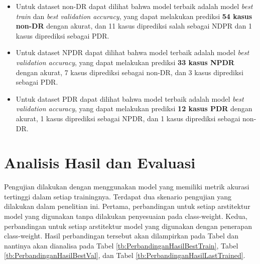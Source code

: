 \begin{itemize}
	\item Untuk dataset non-DR dapat dilihat bahwa model terbaik adalah model \emph{best train} dan \emph{best validation accuracy}, yang dapat melakukan prediksi \textbf{54 kasus non-DR} dengan akurat, dan 11 kasus diprediksi salah sebagai NDPR dan 1 kasus diprediksi sebagai PDR.
	
	\item Untuk dataset NPDR dapat dilihat bahwa model terbaik adalah model \emph{best validation accuracy}, yang dapat melakukan prediksi \textbf{33 kasus NPDR} dengan akurat, 7 kasus diprediksi sebagai non-DR, dan 3 kasus diprediksi sebagai PDR.
	
	\item Untuk dataset PDR dapat dilihat bahwa model terbaik adalah model \emph{best validation accuracy}, yang dapat melakukan prediksi \textbf{12 kasus PDR} dengan akurat, 1 kasus diprediksi sebagai NPDR, dan 1 kasus diprediksi sebagai non-DR.
\end{itemize}

\section{Analisis Hasil dan Evaluasi}
\label{sec:42}

Pengujian dilakukan dengan menggunakan model yang memiliki metrik akurasi tertinggi dalam setiap trainingnya. Terdapat dua skenario pengujian yang dilakukan dalam penelitian ini. Pertama, perbandingan untuk setiap arstitektur model yang digunakan tanpa dilakukan penyesuaian pada class-weight. Kedua, perbandingan untuk setiap arstitektur model yang digunakan dengan penerapan class-weight. Hasil perbandingan tersebut akan dilampirkan pada Tabel dan nantinya akan dianalisa pada Tabel \ref{tb:PerbandinganHasilBestTrain}, Tabel \ref{tb:PerbandinganHasilBestVal}, dan Tabel \ref{tb:PerbandinganHasilLastTrained}.

